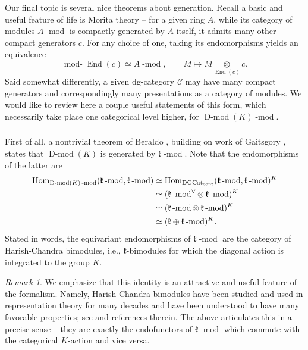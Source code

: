 \documentclass[10pt]{amsart}
\newcommand{\udHom}{\on{Hom}_{\DGCat}}
\newcommand{\on}{\operatorname}
\renewcommand{\mod}{\on{-mod}}
\newcommand{\Dmod}{\on{D-mod}}
\newcommand{\rmod}{\on{mod-}}
\theoremstyle{remark}
\newtheorem{re}[subsubsection]{Remark}
\newcommand{\fk}{\mathfrak{k}}
\newcommand{\End}{\operatorname{End}}
\newcommand{\Hom}{\operatorname{Hom}}
\numberwithin{equation}{section}
\newcommand{\sC}{\mathscr{C}}
\newcommand{\msf}{\operatorname}
\renewcommand{\mod}{\operatorname{-mod}}
\newcommand{\DGCat}{\msf{DGCat}_{\on{cont}}}
\begin{document}
\subsubsection{}Our final topic is several nice 
theorems about generation. Recall a basic and useful feature of life is Morita 
theory -- for a given ring $A$, while its category of modules $A\mod$ is 
compactly generated by $A$ itself, it admits many other compact generators $c$. For any choice of one, taking its endomorphisms yields an equivalence 
%
\[
  \rmod\End(c)  \simeq   A\mod, \quad \quad M \mapsto M \underset{\End(c)} 
  \otimes c.
\] 
%
Said somewhat differently, a given dg-category $\sC$ may have many compact 
generators and correspondingly many presentations as a category of modules. We 
would like to review here a couple useful statements of this form, which 
necessarily take place one categorical level higher, for 
$\Dmod(K)\mod$.


\subsubsection{} \label{ss:hchbimod}
 First of all, a nontrivial theorem of Beraldo \cite{beraldo}, building on work of Gaitsgory \cite{1affine}, states 
that $\Dmod(K)$ is generated by $\fk\mod$. Note that the endomorphisms of the 
latter are 
%
\begin{align*}
   \Hom_{\Dmod(K)\mod}(\fk\mod, \fk\mod) & \simeq \udHom(\fk\mod, \fk\mod)^K \\ 
   & \simeq (\fk\mod^\vee \otimes \hspace{.7mm} \fk\mod)^K \\ & \simeq (\fk\mod \otimes \hspace{.7mm}
   \fk\mod)^K \\ & \simeq (\fk \oplus \fk\mod)^K.
\end{align*}
%
Stated in words, the equivariant endomorphisms of $\fk\mod$ are the category of Harish-Chandra 
bimodules, i.e., $\fk$-bimodules for which 
the diagonal action is integrated to the group $K$. 

\begin{re} We emphasize that this identity is an attractive and useful feature 
of the 
formalism. Namely, Harish-Chandra 
bimodules have been studied and used in representation theory for many decades 
and have been understood to have many favorable properties; see \cite{bege1980} and references therein. The above 
articulates this in a precise sense -- they are exactly the endofunctors 
of $\fk\mod$ which commute with the categorical $K$-action and vice versa.
\end{re}

\end{document}
